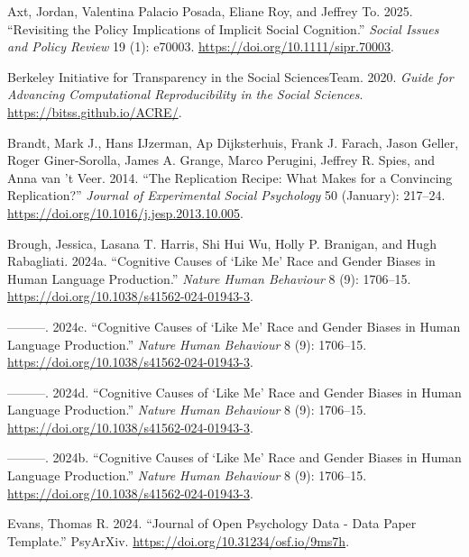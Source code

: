 \documentclass[
  letterpaper,
  DIV=11,
  numbers=noendperiod]{scrartcl}
\newlength{\cslhangindent}
\newenvironment{CSLReferences}[2] %
 {\begin{list}{}{%
  \setlength{\itemindent}{0pt}
  \setlength{\leftmargin}{0pt}
  \setlength{\parsep}{0pt}
  \ifodd #1
   \setlength{\leftmargin}{\cslhangindent}
   \setlength{\itemindent}{-1\cslhangindent}
  \fi
  \setlength{\itemsep}{#2\baselineskip}}}
 {\end{list}}
\begin{document}
\label{refs}
\begin{CSLReferences}{1}{0}
Axt, Jordan, Valentina Palacio Posada, Eliane Roy, and Jeffrey To. 2025.
{``Revisiting the Policy Implications of Implicit Social Cognition.''}
\emph{Social Issues and Policy Review} 19 (1): e70003.
\url{https://doi.org/10.1111/sipr.70003}.

Berkeley Initiative for Transparency in the Social SciencesTeam. 2020.
\emph{Guide for Advancing Computational Reproducibility in the Social
Sciences}. \url{https://bitss.github.io/ACRE/}.

Brandt, Mark J., Hans IJzerman, Ap Dijksterhuis, Frank J. Farach, Jason
Geller, Roger Giner-Sorolla, James A. Grange, Marco Perugini, Jeffrey R.
Spies, and Anna van 't Veer. 2014. {``The {Replication} {Recipe}: {What}
Makes for a Convincing Replication?''} \emph{Journal of Experimental
Social Psychology} 50 (January): 217--24.
\url{https://doi.org/10.1016/j.jesp.2013.10.005}.

Brough, Jessica, Lasana T. Harris, Shi Hui Wu, Holly P. Branigan, and
Hugh Rabagliati. 2024a. {``Cognitive Causes of {`}Like Me{'} Race and
Gender Biases in Human Language Production.''} \emph{Nature Human
Behaviour} 8 (9): 1706--15.
\url{https://doi.org/10.1038/s41562-024-01943-3}.

---------. 2024c. {``Cognitive Causes of {`}Like Me{'} Race and Gender
Biases in Human Language Production.''} \emph{Nature Human Behaviour} 8
(9): 1706--15. \url{https://doi.org/10.1038/s41562-024-01943-3}.

---------. 2024d. {``Cognitive Causes of {`}Like Me{'} Race and Gender
Biases in Human Language Production.''} \emph{Nature Human Behaviour} 8
(9): 1706--15. \url{https://doi.org/10.1038/s41562-024-01943-3}.

---------. 2024b. {``Cognitive Causes of {`}Like Me{'} Race and Gender
Biases in Human Language Production.''} \emph{Nature Human Behaviour} 8
(9): 1706--15. \url{https://doi.org/10.1038/s41562-024-01943-3}.

Evans, Thomas R. 2024. {``Journal of {Open} {Psychology} {Data} - {Data}
{Paper} {Template}.''} PsyArXiv.
\url{https://doi.org/10.31234/osf.io/9ms7h}.


\end{CSLReferences}
\end{document}
